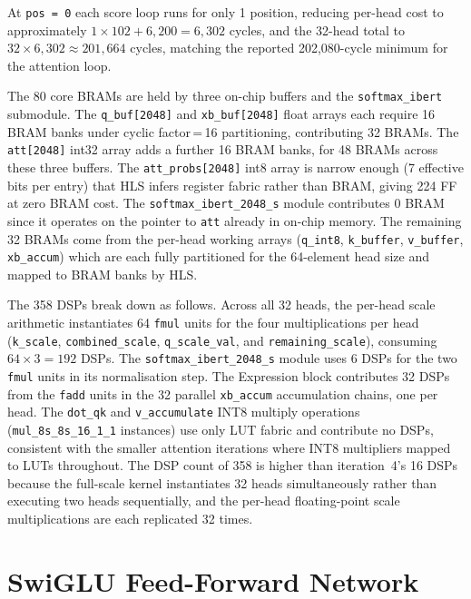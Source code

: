 At \texttt{pos\,=\,0} each score loop runs for only 1 position,
reducing per-head cost to approximately $1 \times 102 + 6{,}200 =
6{,}302$ cycles, and the 32-head total to
$32 \times 6{,}302 \approx 201{,}664$ cycles,
matching the reported 202{,}080-cycle minimum for the attention loop.

The 80 core BRAMs are held by three on-chip buffers and the
\texttt{softmax\_ibert} submodule. The \texttt{q\_buf[2048]} and
\texttt{xb\_buf[2048]} float arrays each require 16 BRAM banks under
cyclic factor\,=\,16 partitioning, contributing 32 BRAMs. The
\texttt{att[2048]} int32 array adds a further 16 BRAM banks, for 48 BRAMs
across these three buffers. The \texttt{att\_probs[2048]} int8 array is
narrow enough (7 effective bits per entry) that HLS infers register fabric
rather than BRAM, giving 224 FF at zero BRAM cost. The
\texttt{softmax\_ibert\_2048\_s} module contributes 0 BRAM since it
operates on the pointer to \texttt{att} already in on-chip memory. The
remaining 32 BRAMs come from the per-head working arrays
(\texttt{q\_int8}, \texttt{k\_buffer}, \texttt{v\_buffer},
\texttt{xb\_accum}) which are each fully partitioned for the 64-element
head size and mapped to BRAM banks by HLS.

The 358 DSPs break down as follows. Across all 32 heads, the per-head
scale arithmetic instantiates 64 \texttt{fmul} units for the four
multiplications per head (\texttt{k\_scale}, \texttt{combined\_scale},
\texttt{q\_scale\_val}, and \texttt{remaining\_scale}), consuming
$64 \times 3 = 192$ DSPs. The \texttt{softmax\_ibert\_2048\_s} module
uses 6 DSPs for the two \texttt{fmul} units in its normalisation step.
The Expression block contributes 32 DSPs from the \texttt{fadd} units
in the 32 parallel \texttt{xb\_accum} accumulation chains, one per head.
The \texttt{dot\_qk} and \texttt{v\_accumulate} INT8 multiply operations
(\texttt{mul\_8s\_8s\_16\_1\_1} instances) use only LUT fabric and
contribute no DSPs, consistent with the smaller attention iterations where
INT8 multipliers mapped to LUTs throughout. The DSP count of 358 is higher
than iteration~4's 16 DSPs because the full-scale kernel instantiates 32
heads simultaneously rather than executing two heads sequentially, and the
per-head floating-point scale multiplications are each replicated 32 times.



\section{SwiGLU Feed-Forward Network}
\label{sec:ffn_impl}

